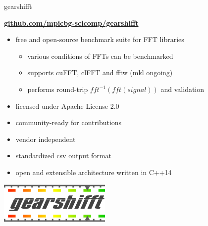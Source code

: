 \documentclass[t,11pt,hyperref={
  pdftitle = {gearshifft},
  pdfsubject = {gearshifft},
  pdfborder={0 0 0},
  colorlinks=true,
  urlcolor=red,
  citecolor=red,
  linkcolor=red,
  pdfauthor={Peter Steinbach, Matthias Werner}
  }
]{beamer}
\begin{document}
\begin{frame}{gearshifft}

\vfill
      \begin{center}\Large
        \href{https://github.com/mpicbg-scicomp/gearshifft}{\textbf{github.com/mpicbg-scicomp/gearshifft}}
      \end{center}

\vfill
  \begin{itemize}
  \item free and open-source benchmark suite for FFT libraries
    \begin{itemize}
    \item various conditions of FFTs can be benchmarked
    \item supports cuFFT, clFFT and fftw (mkl ongoing)
    \item performs round-trip $fft^{-1}(fft(signal))$ and validation
    \end{itemize}
    \pause
    \vfill
  \item licensed under Apache License 2.0
  \item community-ready for contributions
  \item vendor independent 
  \item standardized csv output format
  \item open and extensible architecture written in C++14
  \end{itemize}
\vfill
\pause
\begin{center}
  \includegraphics[width=.35\textwidth]{gearshifft_logo_img_100.png}
\end{center}

\vfill
\end{frame}
\end{document}

